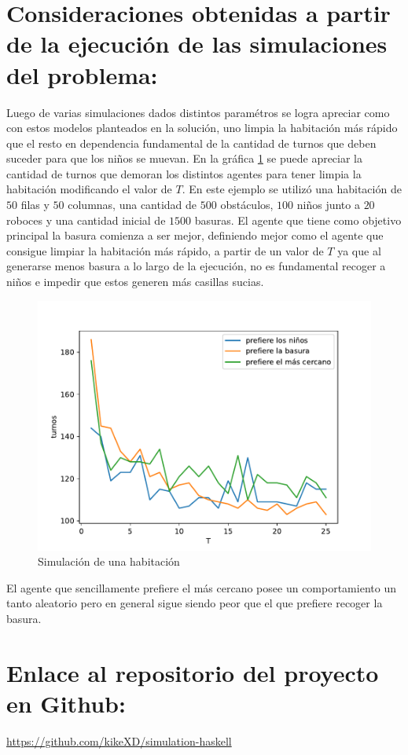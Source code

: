 \documentclass[titlepage,11pt]{scrartcl}
\begin{document}
\section{Consideraciones obtenidas a partir de la ejecución de las simulaciones del problema:}
Luego de varias simulaciones dados distintos paramétros se logra apreciar como con estos modelos planteados en la solución, uno limpia la habitación más rápido que el resto en dependencia fundamental de la cantidad de turnos que deben suceder para que los niños se muevan. En la gráfica \ref{fig:simulation} se puede apreciar la cantidad de turnos que demoran los distintos agentes para tener limpia la habitación modificando el valor de $T$. En este ejemplo se utilizó una habitación de $50$ filas y $50$ columnas, una cantidad de $500$ obstáculos, $100$ niños junto a $20$ roboces y una cantidad inicial de $1500$ basuras. El agente que tiene como objetivo principal la basura comienza a ser mejor, definiendo mejor como el agente que consigue limpiar la habitación más rápido, a partir de un valor de $T$ ya que al generarse menos basura a lo largo de la ejecución, no es fundamental recoger a niños e impedir que estos generen más casillas sucias.

\begin{figure}[htb]
    \begin{center}
        \includegraphics[width=\columnwidth]{./media/simulation.pdf}
    \end{center}
    \caption{Simulación de una habitación\label{fig:simulation}}
\end{figure}

El agente que sencillamente prefiere el más cercano posee un comportamiento un tanto aleatorio pero en general sigue siendo peor que el que prefiere recoger la basura.

\section{Enlace al repositorio del proyecto en Github:}
\url{https://github.com/kikeXD/simulation-haskell}
\end{document}
